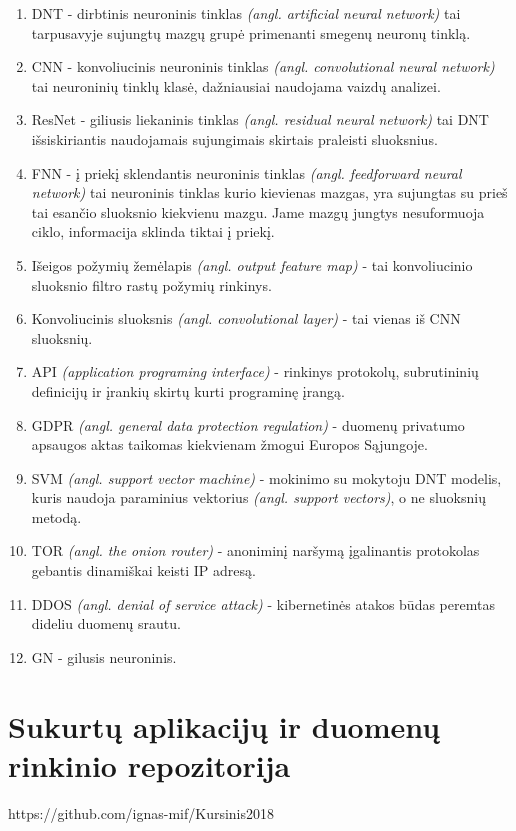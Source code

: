 \documentclass{VUMIFPSkursinis}
\begin{document}


\begin{enumerate}
  \item DNT - dirbtinis neuroninis tinklas \textit{(angl. artificial neural network)} tai tarpusavyje sujungtų mazgų grupė primenanti smegenų neuronų tinklą.
  \item CNN - konvoliucinis neuroninis tinklas \textit{(angl. convolutional neural network)} tai neuroninių tinklų klasė, dažniausiai naudojama vaizdų analizei.
  \item ResNet - giliusis liekaninis tinklas \textit{(angl. residual neural network)} tai DNT išsiskiriantis naudojamais sujungimais skirtais praleisti sluoksnius.
  \item FNN - į priekį sklendantis neuroninis tinklas \textit{(angl. feedforward neural network)} tai neuroninis tinklas kurio kievienas mazgas, yra sujungtas su prieš tai esančio sluoksnio kiekvienu mazgu. Jame mazgų jungtys nesuformuoja ciklo, informacija sklinda tiktai į priekį.
  \item Išeigos požymių žemėlapis \textit{(angl. output feature map)} - tai konvoliucinio sluoksnio filtro rastų požymių rinkinys.
  \item Konvoliucinis sluoksnis \textit{(angl. convolutional layer)} - tai vienas iš CNN sluoksnių.
  \item API \textit{(application programing interface)} - rinkinys protokolų, subrutininių definicijų ir įrankių skirtų kurti programinę įrangą.
  \item GDPR \textit{(angl. general data protection regulation)} - duomenų privatumo apsaugos aktas taikomas kiekvienam žmogui Europos Sąjungoje.
  \item SVM \textit{(angl. support vector machine)} - mokinimo su mokytoju DNT modelis, kuris naudoja paraminius vektorius \textit{(angl. support vectors)}, o ne sluoksnių metodą.
  \item TOR \textit{(angl. the onion router)} - anoniminį naršymą įgalinantis protokolas gebantis dinamiškai keisti IP adresą.
  \item DDOS \textit{(angl. denial of service attack)} - kibernetinės atakos būdas peremtas dideliu duomenų srautu.
  \item GN - gilusis neuroninis.
\end{enumerate}

\appendix  %
\section{Sukurtų aplikacijų ir duomenų rinkinio repozitorija}

https://github.com/ignas-mif/Kursinis2018
\end{document}
